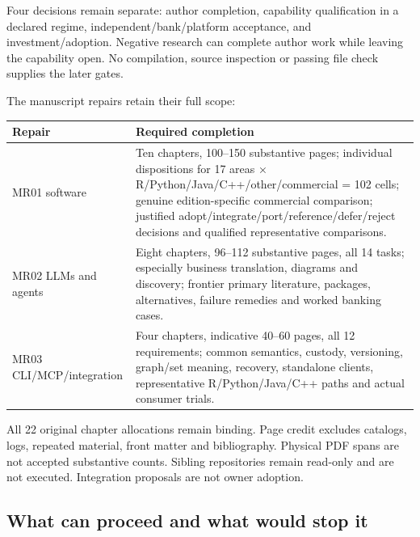 \documentclass[
  10pt,
]{article}
\begin{document}
Four decisions remain separate: author completion, capability
qualification in a declared regime, independent/bank/platform
acceptance, and investment/adoption. Negative research can complete
author work while leaving the capability open. No compilation, source
inspection or passing file check supplies the later gates.

The manuscript repairs retain their full scope:

\begin{longtable}[]{@{}>{\raggedright\arraybackslash}p{}>{\raggedright\arraybackslash}p{}@{}}
\toprule
Repair & Required completion\tabularnewline
\midrule
\endhead
MR01 software & Ten chapters, 100--150 substantive pages; individual
dispositions for 17 areas × R/Python/Java/C++/other/commercial = 102
cells; genuine edition-specific commercial comparison; justified
adopt/integrate/port/reference/defer/reject decisions and qualified
representative comparisons.\tabularnewline
MR02 LLMs and agents & Eight chapters, 96--112 substantive pages, all 14
tasks; especially business translation, diagrams and discovery; frontier
primary literature, packages, alternatives, failure remedies and worked
banking cases.\tabularnewline
MR03 CLI/MCP/integration & Four chapters, indicative 40--60 pages, all
12 requirements; common semantics, custody, versioning, graph/set
meaning, recovery, standalone clients, representative R/Python/Java/C++
paths and actual consumer trials.\tabularnewline
\bottomrule
\end{longtable}

All 22 original chapter allocations remain binding. Page credit excludes
catalogs, logs, repeated material, front matter and bibliography.
Physical PDF spans are not accepted substantive counts. Sibling
repositories remain read-only and are not executed. Integration
proposals are not owner adoption.

\hypertarget{what-can-proceed-and-what-would-stop-it}{%
\subsection{What can proceed and what would stop
it}\label{what-can-proceed-and-what-would-stop-it}}
\end{document}

